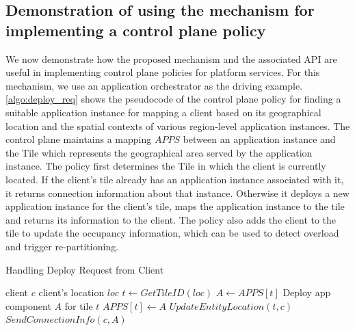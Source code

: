 \subsection{Demonstration of using the mechanism for implementing a control plane policy}
We now demonstrate how the proposed mechanism and the associated API are useful in implementing control plane policies for platform services. For this mechanism, we use an application orchestrator as the driving example. \cref{algo:deploy_req} shows the pseudocode of the control plane policy for finding a suitable application instance for mapping a client based on its geographical location and the spatial contexts of various region-level application instances. The control plane maintains a mapping $APPS$ between an application instance and the Tile which represents the geographical area served by the application instance. The policy first determines the Tile in which the client is currently located. If the client's tile already has an application instance associated with it, it returns connection information about that instance. Otherwise it deploys a new application instance for the client's tile, maps the application instance to the tile and returns its information to the client. The policy also adds the client to the tile to update the occupancy information, which can be used to detect overload and trigger re-partitioning.
\begin{algorithm}
\caption{Handling Deploy Request from Client}
\begin{algorithmic}
\Require client $c$
\Require client's location $loc$
\State $t \gets GetTileID \left( loc \right)$
    \State $A \gets APPS \left[ t \right]$
\Else
    \State Deploy app component $A$ for tile $t$
    \State $APPS  \left[ t \right] \gets A$
\EndIf
\State $UpdateEntityLocation \left(t, c \right)$
\State $SendConnectionInfo \left(c, A \right)$ 
\end{algorithmic}
\label{algo:deploy_req}
\end{algorithm}

